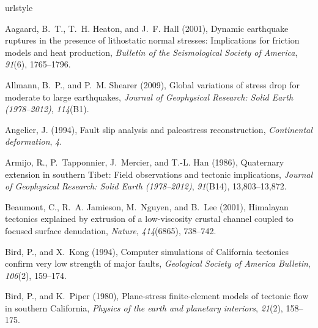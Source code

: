 \documentclass[twocolumn,jgrga]{AGUTeX}
\begin{document}
\begin{article}
{{{\begin{thebibliography}{89}
\providecommand{\natexlab}[1]{#1}
\expandafter\ifx\csname urlstyle\endcsname\relax
  \providecommand{\doi}[1]{doi:\discretionary{}{}{}#1}\else
  \providecommand{\doi}{doi:\discretionary{}{}{}\begingroup
  \urlstyle{rm}\Url}\fi

Aagaard, B.~T., T.~H. Heaton, and J.~F. Hall (2001), Dynamic earthquake
  ruptures in the presence of lithostatic normal stresses: {I}mplications for
  friction models and heat production, \textit{Bulletin of the Seismological
  Society of America}, \textit{91}(6), 1765--1796.

Allmann, B.~P., and P.~M. Shearer (2009), Global variations of stress drop for
  moderate to large earthquakes, \textit{Journal of Geophysical Research: Solid
  Earth (1978--2012)}, \textit{114}(B1).

Angelier, J. (1994), Fault slip analysis and paleostress reconstruction,
  \textit{Continental deformation}, \textit{4}.

Armijo, R., P.~Tapponnier, J.~Mercier, and T.-L. Han (1986), Quaternary
  extension in southern {T}ibet: {F}ield observations and tectonic
  implications, \textit{Journal of Geophysical Research: Solid Earth
  (1978--2012)}, \textit{91}(B14), 13,803--13,872.

Beaumont, C., R.~A. Jamieson, M.~Nguyen, and B.~Lee (2001), Himalayan tectonics
  explained by extrusion of a low-viscosity crustal channel coupled to focused
  surface denudation, \textit{Nature}, \textit{414}(6865), 738--742.

Bird, P., and X.~Kong (1994), Computer simulations of {C}alifornia tectonics
  confirm very low strength of major faults, \textit{Geological Society of
  America Bulletin}, \textit{106}(2), 159--174.

Bird, P., and K.~Piper (1980), Plane-stress finite-element models of tectonic
  flow in southern {C}alifornia, \textit{Physics of the earth and planetary
  interiors}, \textit{21}(2), 158--175.


\end{thebibliography}}}}
\end{article}
\end{document}
